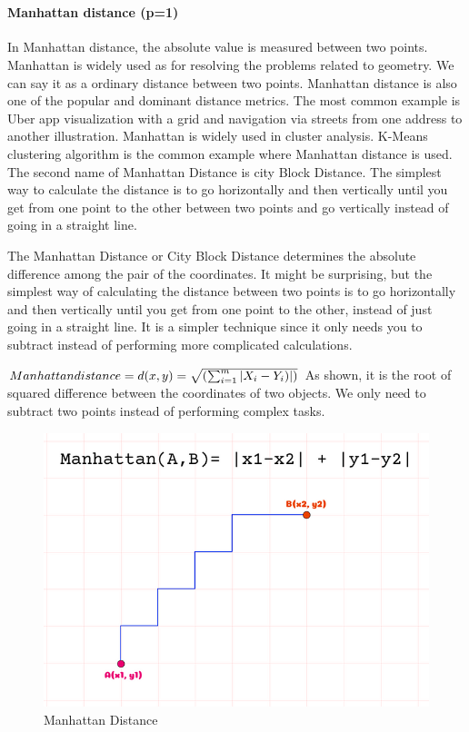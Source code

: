 \documentclass[conference]{IEEEtran}
\begin{document}
\



\paragraph{\textbf{Manhattan distance (p=1)}}
In Manhattan distance, the absolute value is measured between two points. Manhattan is widely used as for resolving the problems related to geometry. We can say it as a ordinary distance between two points. Manhattan distance is also one of the popular and dominant distance metrics. The most common example is Uber app visualization with a grid and navigation via streets from one address to another illustration. Manhattan is widely used in cluster analysis. K-Means clustering algorithm is the common example where Manhattan distance is used. The second name of Manhattan Distance is city Block Distance. The simplest way to calculate the distance is to go horizontally and then vertically until you get from one point to the other between two points and go vertically instead of going in a straight line. 

The Manhattan Distance or City Block Distance determines the absolute difference among the pair of the coordinates. It might be surprising, but the simplest way of calculating the distance between two points is to go horizontally and then vertically until you get from one point to the other, instead of just going in a straight line. It is a simpler technique since it only needs you to subtract instead of performing more complicated calculations.

\begin{math}
 Manhattan distance = d(x,y)=\sqrt{(\sum_{i=1}^{m} |X_{i} - Y_{i})|)}
 \newline
\end{math}
As shown, it is the root of squared difference between the coordinates of two objects. We only need to subtract two points instead of performing complex tasks. 

\begin{figure}
    \centering
    \includegraphics[width=0.8\linewidth]{a.png}
    \caption{Manhattan Distance}
    \label{fig:enter-label}
\end{figure}
\end{document}

